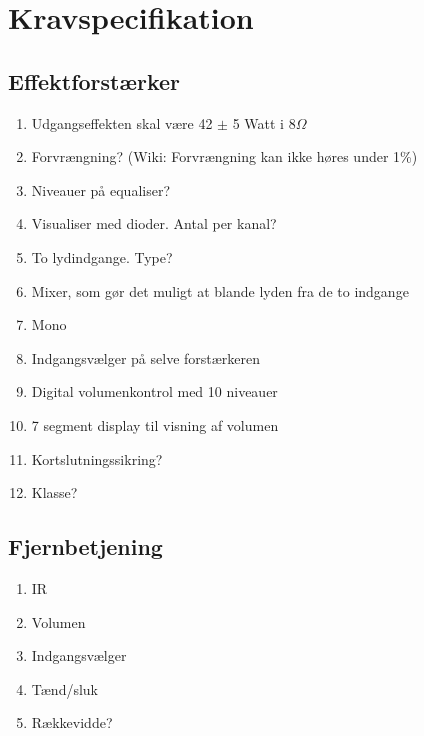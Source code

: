 \chapter{Kravspecifikation}
\section*{Effektforstærker}
\begin{enumerate}
\item Udgangseffekten skal være 42 $\pm$ 5 Watt i 8$\Omega$
\item Forvrængning? (Wiki: Forvrængning kan ikke høres under 1\%)
\item Niveauer på equaliser?
\item Visualiser med dioder. Antal per kanal?
\item To lydindgange. Type?
\item Mixer, som gør det muligt at blande lyden fra de to indgange
\item Mono
\item Indgangsvælger på selve forstærkeren
\item Digital volumenkontrol med 10 niveauer
\item 7 segment display til visning af volumen
\item Kortslutningssikring?
\item Klasse?
\end{enumerate}

\section*{Fjernbetjening}
\begin{enumerate}
\item IR
\item Volumen
\item Indgangsvælger
\item Tænd/sluk
\item Rækkevidde?
\end{enumerate}
